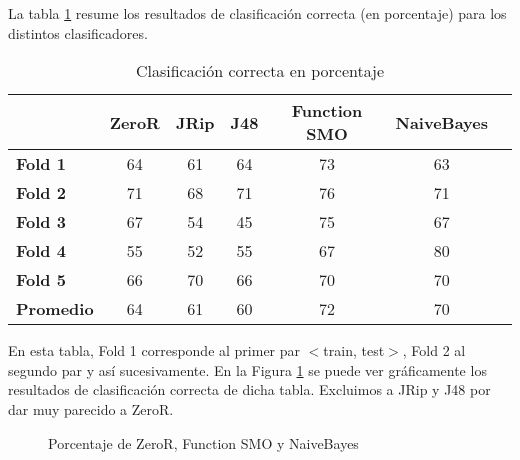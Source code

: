 La tabla \ref{class_corr_en_pct} resume los resultados de clasificación correcta (en porcentaje) para los distintos clasificadores.

\begin{table}[H]
	\centering
	\begin{tabular}{|l|c|c|c|c|c|c|}
		\hline
		\textbf{}  & \textbf{ZeroR} & \textbf{JRip} & \textbf{J48} & \textbf{Function SMO} & \textbf{NaiveBayes} \\ \hline
		\textbf{Fold 1}  & 64 & 61 & 64 & 73 & 63 \\ \hline
		\textbf{Fold 2}  & 71 & 68 & 71 & 76 & 71 \\ \hline
		\textbf{Fold 3}  & 67 & 54 & 45 & 75 & 67 \\ \hline
		\textbf{Fold 4}  & 55 & 52 & 55 & 67 & 80 \\ \hline
		\textbf{Fold 5}  & 66 & 70 & 66 & 70 & 70 \\ \hline
		\hline \hline
		\textbf{Promedio} & 64 & 61 & 60 & 72 & 70 \\ \hline
	\end{tabular}
	\caption{Clasificación correcta en porcentaje}
	\label{class_corr_en_pct}
\end{table}

En esta tabla, Fold 1 corresponde al primer par $<$train, test$>$, Fold 2 al segundo par y así sucesivamente. En la Figura \ref{porcentajexClasificador} se puede ver gráficamente los resultados de clasificación correcta de dicha tabla. Excluimos a JRip y J48 por dar muy parecido a ZeroR.

\begin{figure}[H]
	\centering
	\caption{Porcentaje de ZeroR, Function SMO y NaiveBayes}
	\label{porcentajexClasificador}
\end{figure}

